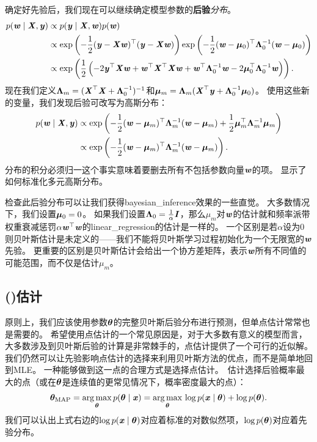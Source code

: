 确定好先验后，我们现在可以继续确定模型参数的\textbf{后验}\emph{分布}。
\begin{align}
    p(\Vw \mid \MX, \Vy) &\propto p(\Vy \mid \MX, \Vw) p(\Vw) \\
    & \propto 
        \exp\left( 
            -\frac{1}{2} ( \Vy - \MX\Vw )^\Tsp( \Vy - \MX\Vw )
        \right)
        \exp\left(
    -\frac{1}{2} ( \Vw - \Vmu_0)^\Tsp \VLambda_0^{-1} ( \Vw - \Vmu_0)
        \right) \\
    & \propto \exp
    \left(
    \frac{1}{2}\left(
    -2\Vy^\Tsp\MX\Vw + \Vw^\Tsp\MX^\Tsp\MX\Vw + \Vw^\Tsp\VLambda_0^{-1}\Vw - 
    2\Vmu_0^\Tsp \VLambda_0^{-1}\Vw
    \right)
    \right).
\end{align}
现在我们定义$\VLambda_m = (\MX^\Tsp\MX + \VLambda_0^{-1})^{-1}$和$\Vmu_m = \VLambda_m ( \MX^\Tsp \Vy + \VLambda_0^{-1}\Vmu_0 )$。
使用这些新的变量，我们发现后验可改写为高斯分布：
\begin{align}
    p(\Vw \mid \MX, \Vy) &\propto \exp \left(
    -\frac{1}{2} (\Vw - \Vmu_m )^\Tsp \VLambda_m^{-1}  (\Vw - \Vmu_m ) 
    + \frac{1}{2} \Vmu_m^\Tsp \VLambda_m^{-1}  \Vmu_m 
    \right) \\
    &\propto \exp\left(
    -\frac{1}{2} (\Vw - \Vmu_m)^\Tsp \VLambda_m^{-1} (\Vw - \Vmu_m)
    \right).
\end{align}
分布的积分必须归一这个事实意味着要删去所有不包括参数向量$\Vw$的项。
显示了如何标准化多元高斯分布。


检查此后验分布可以让我们获得\gls{bayesian_inference}效果的一些直觉。
大多数情况下，我们设置$\Vmu_0 = 0$。
如果我们设置$\VLambda_0 = \frac{1}{\alpha}\MI$，那么$\mu_m$对$\Vw$的估计就和频率派带权重衰减惩罚$\alpha\Vw^\Tsp\Vw$的\gls{linear_regression}的估计是一样的。
一个区别是若$\alpha$设为$0$则贝叶斯估计是未定义的——我们不能将贝叶斯学习过程初始化为一个无限宽的$\Vw$先验。
更重要的区别是贝叶斯估计会给出一个协方差矩阵，表示$\Vw$所有不同值的可能范围，而不仅是估计$\mu_m$。

\subsection{()估计}
\label{sec:maximum_a_posteriori_map_estimation}
原则上，我们应该使用参数$\Vtheta$的完整贝叶斯后验分布进行预测，但单点估计常常也是需要的。
希望使用点估计的一个常见原因是，对于大多数有意义的模型而言，大多数涉及到贝叶斯后验的计算是非常棘手的，点估计提供了一个可行的近似解。
我们仍然可以让先验影响点估计的选择来利用贝叶斯方法的优点，而不是简单地回到\gls{MLE}。
一种能够做到这一点的合理方式是选择点估计。
\,估计选择后验概率最大的点（或在$\Vtheta$是连续值的更常见情况下，概率密度最大的点）：
\begin{equation}
\label{eq:5.79}
    \Vtheta_{\text{MAP}} = \underset{\Vtheta}{\argmax} \, p(\Vtheta\mid\Vx)
    = \underset{\Vtheta}{\argmax} \, \log p(\Vx \mid \Vtheta) + \log p(\Vtheta) .
\end{equation}
我们可以认出上式右边的$\log p(\Vx \mid \Vtheta)$对应着标准的对数似然项，$\log p(\Vtheta)$对应着先验分布。


